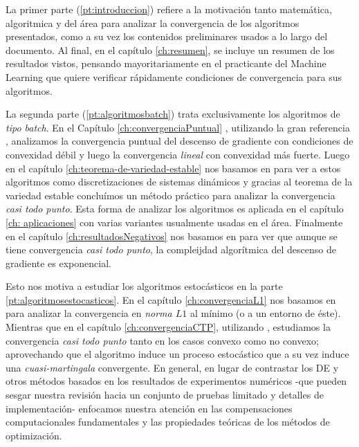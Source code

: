 La primer parte (\ref{pt:introduccion}) refiere a la motivaci\'on tanto matem\'atica, algoritmica y del \'area para analizar la convergencia de los algoritmos presentados, como a su vez los contenidos preliminares usados a lo largo del documento. Al final, en el cap\'itulo \ref{ch:resumen}, se incluye un resumen de los resultados vistos, pensando mayoritariamente  en el practicante del Machine Learning que quiere verificar r\'apidamente condiciones de convergencia para sus algoritmos.

La segunda parte (\ref{pt:algoritmosbatch}) trata exclusivamente los algoritmos de \textit{tipo batch}. En el Cap\'itulo \ref{ch:convergenciaPuntual} , utilizando la gran referencia \cite{nesterov:2004}, analizamos la convergencia puntual del descenso de gradiente con condiciones de convexidad d\'ebil y luego la convergencia \textit{lineal} con convexidad m\'as fuerte. Luego en el cap\'itulo \ref{ch:teorema-de-variedad-estable} nos basamos en \cite{lee:2017} para ver a estos algoritmos como discretizaciones de sistemas din\'amicos y gracias al teorema de la variedad estable conclu\'imos un m\'etodo pr\'actico para analizar la convergencia \textit{casi todo punto}. Esta forma de analizar los algoritmos es aplicada en el cap\'itulo \ref{ch: aplicaciones} con varias variantes usualmente usadas en el \'area. Finalmente en el cap\'itulo \ref{ch:resultadosNegativos} nos basamos en \cite{du:2017} para ver que aunque se tiene convergencia \textit{casi todo punto}, la compleijdad algor\'itmica del descenso de gradiente es exponencial.

Esto nos motiva a estudiar los algoritmos estoc\'asticos en la parte \ref{pt:algoritmosestocasticos}. En el cap\'itulo \ref{ch:convergenciaL1} nos basamos en \cite{bottou:2016} para analizar la convergencia en \textit{norma $L1$} al m\'inimo (o a un entorno de \'este). Mientras que en el cap\'itulo \ref{ch:convergenciaCTP}, utilizando \cite{bottou:1999}, estudiamos la convergencia \textit{casi todo punto} tanto en los casos convexo como no convexo; aprovechando que el algoritmo induce un proceso estoc\'astico que a su vez induce una \textit{cuasi-martingala} convergente. En general, en lugar de contrastar los DE y otros m\'etodos basados en los resultados de experimentos num\'ericos -que pueden sesgar nuestra revisi\'on hacia un conjunto de pruebas limitado y detalles de implementaci\'on- enfocamos nuestra atenci\'on en las compensaciones computacionales fundamentales y las propiedades te\'oricas de los m\'etodos de optimizaci\'on.